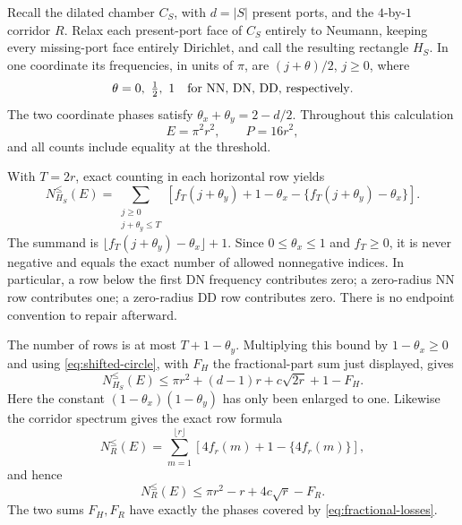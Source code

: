 \documentclass[11pt,reqno]{amsart}
\numberwithin{equation}{section}
\begin{document}
Recall the dilated chamber $C_S$, with $d=|S|$ present ports, and the
$4$-by-$1$ corridor $R$. Relax each present-port face of $C_S$ entirely
to Neumann, keeping every missing-port face entirely Dirichlet, and call
the resulting rectangle $H_S$. In one coordinate its frequencies, in
units of $\pi$, are $(j+\theta)/2$, $j\ge0$, where
\[
 \theta=0,\ \tfrac12,\ 1
 \quad\hbox{for NN, DN, DD, respectively}.
\]
The two coordinate phases satisfy
$\theta_x+\theta_y=2-d/2$. Throughout this calculation
\begin{equation}
 E=\pi^2r^2,
 \qquad P=16r^2,
 \label{eq:compact-energy-coordinate}
\end{equation}
and all counts include equality at the threshold.

With $T=2r$, exact counting in each horizontal row yields
\[
 N_{H_S}^{\le}(E)=\sum_{\substack{j\ge0\\j+\theta_y\le T}}
 \left[f_T(j+\theta_y)+1-\theta_x
       -\{f_T(j+\theta_y)-\theta_x\}\right].
\]
The summand is $\lfloor f_T(j+\theta_y)-\theta_x\rfloor+1$.
Since $0\le\theta_x\le1$ and $f_T\ge0$, it is never negative and
equals the exact number of allowed nonnegative indices. In particular,
a row below the first DN frequency contributes zero; a zero-radius NN
row contributes one; a zero-radius DD row contributes zero. There is no
endpoint convention to repair afterward.

The number of rows is at most $T+1-\theta_y$. Multiplying this bound by
$1-\theta_x\ge0$ and using \eqref{eq:shifted-circle}, with $F_H$ the
fractional-part sum just displayed, gives
\begin{equation}
 N_{H_S}^{\le}(E)\le\pi r^2+(d-1)r+c\sqrt{2r}+1-F_H.
 \label{eq:chamber-tail-bookkeeping}
\end{equation}
Here the constant $(1-\theta_x)(1-\theta_y)$ has only been enlarged to
one. Likewise the corridor spectrum gives the exact row formula
\[
 N_R^{\le}(E)=\sum_{m=1}^{\lfloor r\rfloor}
       \left[4f_r(m)+1-\{4f_r(m)\}\right],
\]
and hence
\begin{equation}
 N_R^{\le}(E)\le\pi r^2-r+4c\sqrt r-F_R.
 \label{eq:corridor-tail-bookkeeping}
\end{equation}
The two sums $F_H,F_R$ have exactly the phases covered by
\eqref{eq:fractional-losses}.
\end{document}
